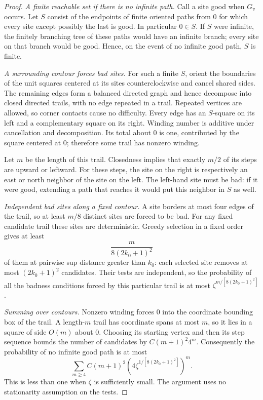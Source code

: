 \begin{proof}
\emph{A finite reachable set if there is no infinite path.}
Call a site good when $G_v$ occurs. Let $S$ consist of the endpoints of
finite oriented paths from $0$ for which every site except possibly the
last is good. In particular $0\in S$. If $S$ were infinite, the finitely
branching tree of these paths would have an infinite branch; every site
on that branch would be good. Hence, on the event of no infinite good
path, $S$ is finite.

\emph{A surrounding contour forces bad sites.}
For such a finite $S$, orient the boundaries of the unit squares centered
at its sites counterclockwise and cancel shared sides. The remaining
edges form a balanced directed graph and hence decompose into closed
directed trails, with no edge repeated in a trail. Repeated vertices are
allowed, so corner contacts cause no difficulty. Every edge has an
$S$-square on its left and a complementary square on its right.
Winding number is additive under cancellation and decomposition. Its
total about $0$ is one, contributed by the square centered at $0$;
therefore some trail has nonzero winding.

Let $m$ be the length of this trail. Closedness implies that exactly
$m/2$ of its steps are upward or leftward. For these steps, the site on
the right is respectively an east or north neighbor of the site on the
left. The left-hand site must be bad: if it were good, extending a path
that reaches it would put this neighbor in $S$ as well.

\emph{Independent bad sites along a fixed contour.}
A site borders at most four edges of the trail, so at least $m/8$
distinct sites are forced to be bad. For any fixed candidate trail these
sites are deterministic. Greedy selection in a fixed order gives at least
\[
 \frac{m}{8(2k_0+1)^2}
\]
of them at pairwise sup distance greater than $k_0$: each selected site
removes at most $(2k_0+1)^2$ candidates. Their tests are independent, so
the probability of all the badness conditions forced by this particular
trail is at most $\zeta^{m/[8(2k_0+1)^2]}$.

\emph{Summing over contours.}
Nonzero winding forces $0$ into the coordinate bounding box of the
trail. A length-$m$ trail has coordinate spans at most $m$, so it lies
in a square of side $O(m)$ about $0$. Choosing its starting vertex and
then its step sequence bounds the number of candidates by
$C(m+1)^2 4^m$. Consequently the probability of no infinite good path
is at most
\[
 \sum_{m\ge4} C(m+1)^2
       \left(4\zeta^{1/[8(2k_0+1)^2]}\right)^m.
\]
This is less than one when $\zeta$ is sufficiently small. The argument
uses no stationarity assumption on the tests.
\end{proof}

